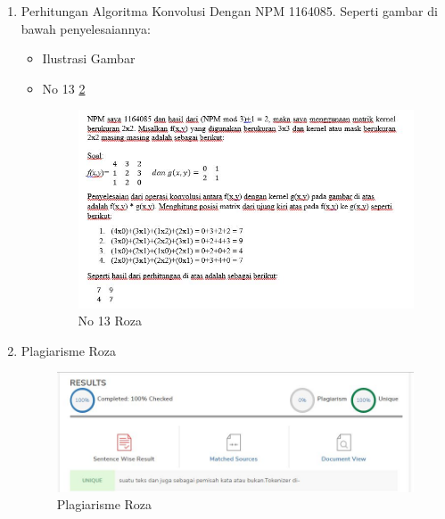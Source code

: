 \begin{enumerate}
\item Perhitungan Algoritma Konvolusi Dengan NPM 1164085. Seperti gambar di bawah penyelesaiannya:
\begin{itemize}
\item Ilustrasi Gambar
\item No 13 \ref{teori13}
\begin{figure}[!hbtp]
\centering
\includegraphics[scale=0.6]{figures/teori13.jpg}
\caption{No 13 Roza}
\label{teori13}
\end{figure}
\par
\end{itemize}
\par
\par
\item Plagiarisme Roza
\begin{figure}[!hbtp]
\centering
\includegraphics[scale=0.6]{figures/plagairismerozac7.jpg}
\caption{Plagiarisme Roza}
\label{teori13}
\end{figure}
\par
\end{enumerate}
\par
\par

